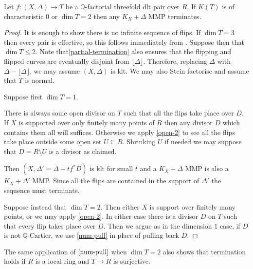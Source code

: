 	
	\begin{corollary}\label{termination}
		Let $f:(X,\Delta) \to T$ be a $\mathbb{Q}$-factorial threefold dlt pair over $R$, If $K(T)$ is of characteristic $0$ or $\dim T =2$ then any $K_{X}+\Delta$ MMP terminates.
	\end{corollary}
	
	\begin{proof}
				
		It is enough to show there is no infinite sequence of flips. If $\dim T=3$ then every pair is effective, so this follows immediately from \cite[Theorem F]{bhatt2020}. Suppose then that $\dim T \leq 2$. Note that\autoref{partial-termination} also ensures that the flipping and flipped curves are eventually disjoint from $\lfloor \Delta \rfloor$. Therefore, replacing $\Delta$ with $\Delta-\lfloor \Delta \rfloor$, we may assume $(X,\Delta)$ is klt. We may also Stein factorise and assume that $T$ is normal.
		
		Suppose first $\dim T=1$.
		
		There is always some open divisor on $T$ such that all the flips take place over $D$. If $X$ is supported over only finitely many points of $R$ then any divisor $D$ which contains them all will suffices. Otherwise we apply \autoref{open-2} to see all the flips take place outside some open set $U \subseteq R$. Shrinking $U$ if needed we may suppose that $D=R \setminus U$ is a divisor as claimed.

		Then $(X,\Delta'=\Delta+tf^{*}D)$ is klt for small $t$ and a $K_{X}+\Delta$ MMP is also a $K_{X}+\Delta'$ MMP. Since all the flips are contained in the support of $\Delta'$ the sequence must terminate.
		
		Suppose instead that $\dim T=2$. Then either $X$ is support over finitely many points, or we may apply \autoref{open-2}. In either case there is a divisor $D$ on $T$ such that every flip takes place over $D$. Then we argue as in the dimension $1$ case, if $D$ is not $\mathbb{Q}$-Cartier, we use \autoref{num-pull} in place of pulling back $D$.
		 
	\end{proof}

	\begin{remark}
		
		The same application of $\autoref{num-pull}$ when $\dim T=2$ also shows that termination holds if $R$ is a local ring and $T \to R$ is surjective.
		
		\end{remark}
	
